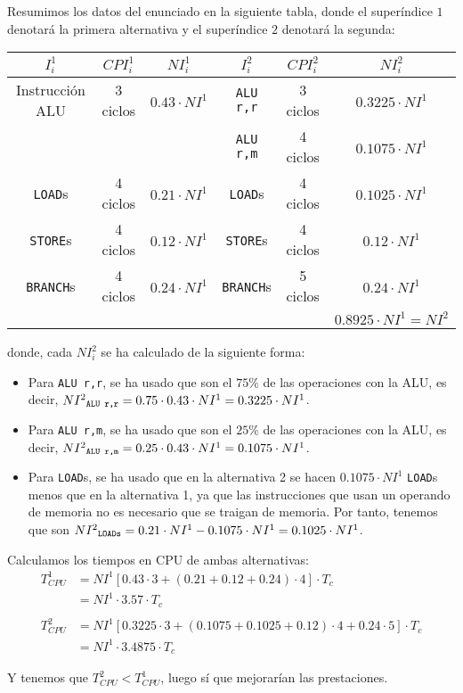 \begin{ejercicio}
    Resumimos los datos del enunciado en la siguiente tabla, donde el superíndice $1$ denotará la primera alternativa y el superíndice $2$ denotará la segunda:
    \begin{table}[H]
        \centering
        \begin{tabular}{c|c|c||c|c|c}
            $I_i^1$ & $CPI_i^1$ & $NI_i^1$ & $I_i^2$ & $CPI_i^2$ & $NI_i^2$ \\
            \hline
            Instrucción ALU & 3 ciclos & $0.43 \cdot NI^1$ & \verb|ALU r,r| & 3 ciclos & $0.3225 \cdot NI^1$ \\
                            & & & \verb|ALU r,m| & 4 ciclos &  $ 0.1075 \cdot NI^1$ \\
            \verb|LOAD|s & 4 ciclos & $0.21 \cdot NI^1$ & \verb|LOAD|s & 4 ciclos & $0.1025 \cdot NI^1$ \\
            \verb|STORE|s & 4 ciclos & $0.12 \cdot NI^1$ & \verb|STORE|s & 4 ciclos & $0.12 \cdot NI^1$ \\
            \verb|BRANCH|s & 4 ciclos & $0.24 \cdot NI^1$ & \verb|BRANCH|s & 5 ciclos & $0.24 \cdot NI^1$  \\
            \hline
                           & & & & & $0.8925\cdot NI^1 = NI^2$ \\
        \end{tabular}
    \end{table}
    donde, cada $NI_i^2$ se ha calculado de la siguiente forma:
    \begin{itemize}
        \item Para \verb|ALU r,r|, se ha usado que son el $75\%$ de las operaciones con la ALU, es decir, $NI^2{\sb\texttt{ALU r,r}}=0.75 \cdot 0.43 \cdot NI^1 = 0.3225 \cdot NI^1$.
        \item Para \verb|ALU r,m|, se ha usado que son el $25\%$ de las operaciones con la ALU, es decir, $NI^2{\sb\texttt{ALU r,m}} = 0.25 \cdot 0.43 \cdot NI^1 = 0.1075 \cdot NI^1$.
        \item Para \verb|LOAD|s, se ha usado que en la alternativa 2 se hacen $0.1075 \cdot NI^1$ \verb|LOAD|s menos que en la alternativa 1, ya que las instrucciones que usan un operando de memoria no es necesario que se traigan de memoria.
        Por tanto, tenemos que son $NI^2{\sb\texttt{LOADs}} = 0.21 \cdot NI^1 - 0.1075 \cdot NI^1 = 0.1025 \cdot NI^1$.
    \end{itemize}

    Calculamos los tiempos en CPU de ambas alternativas:
    \begin{align*}
        T_{CPU}^1 &= NI^1 [0.43\cdot 3 +(0.21+0.12+0.24)\cdot 4] \cdot T_c\\
                  &= NI^1 \cdot 3.57 \cdot T_c\\
                  & \\
        T_{CPU}^2 &= NI^1 [0.3225\cdot 3 + (0.1075+0.1025+0.12)\cdot 4 + 0.24 \cdot 5] \cdot T_c\\
        &= NI^1 \cdot 3.4875 \cdot T_c
    \end{align*}

    Y tenemos que $T_{CPU}^2 < T_{CPU}^1$, luego sí que mejorarían las prestaciones.

\end{ejercicio}

